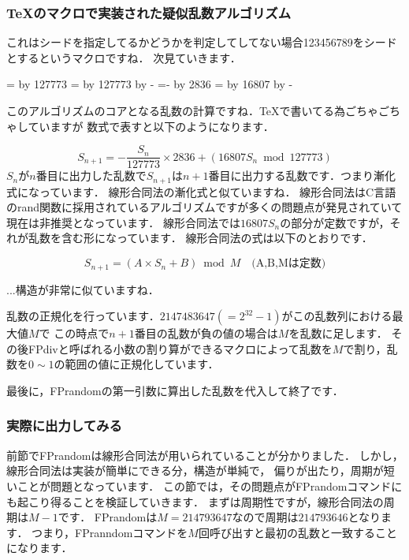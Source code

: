 \subsubsection{\TeX のマクロで実装された疑似乱数アルゴリズム}
\begin{texcode}
\ifnum{}%
\else%
\fi%
\end{texcode}
これはシードを指定してるかどうかを判定してしてない場合123456789をシードとするというマクロですね．
次見ていきます．
\begin{texcode}
\FP@xia=\FPseed%
\divide\FP@xia by 127773%
\FP@xib=\FP@xia%
\multiply\FP@xib by 127773%
\advance\FP@xib by -\FPseed%
\FP@xib=-\FP@xib%
\multiply\FP@xia by 2836%
\FPseed=\FP@xib%
\multiply\FPseed by 16807%
\advance\FPseed by -\FP@xia%
\end{texcode}
このアルゴリズムのコアとなる乱数の計算ですね．\TeX で書いてる為ごちゃごちゃしていますが
数式で表すと以下のようになります．

\[
S_{n+1} = - \frac{S_n}{127773}\times 2836 + (16807S_n \bmod 127773)
\]
$S_n$が$n$番目に出力した乱数で$S_{n+1}$は$n+1$番目に出力する乱数です．つまり漸化式になっています．
線形合同法の漸化式と似ていますね．
線形合同法はC言語のrand関数に採用されているアルゴリズムですが多くの問題点が発見されていて現在は非推奨となっています．
線形合同法では$16807S_n$の部分が定数ですが，それが乱数を含む形になっています．
線形合同法の式は以下のとおりです．

\[
S_{n+1}=(A\times S_n + B) \bmod M \quad \textrm{(A,B,Mは定数)}
\]

...構造が非常に似ていますね．

乱数の正規化を行っています．$2147483647(=2^{32}-1)$がこの乱数列における最大値$M$で
この時点で$n+1$番目の乱数が負の値の場合は$M$を乱数に足します．
その後FPdivと呼ばれる小数の割り算ができるマクロによって乱数を$M$で割り，乱数を$0\sim 1$の範囲の値に正規化しています．
最後に，FPrandomの第一引数に算出した乱数を代入して終了です．
\subsubsection{実際に出力してみる}
前節でFPrandomは線形合同法が用いられていることが分かりました．
しかし，線形合同法は実装が簡単にできる分，構造が単純で，
偏りが出たり，周期が短いことが問題となっています．
この節では，その問題点がFPrandomコマンドにも起こり得ることを検証していきます．
まずは周期性ですが，線形合同法の周期は$M-1$です．
FPrandomは$M=214793647$なので周期は$214793646$となります．
つまり，FPranndomコマンドを$M$回呼び出すと最初の乱数と一致することになります．
